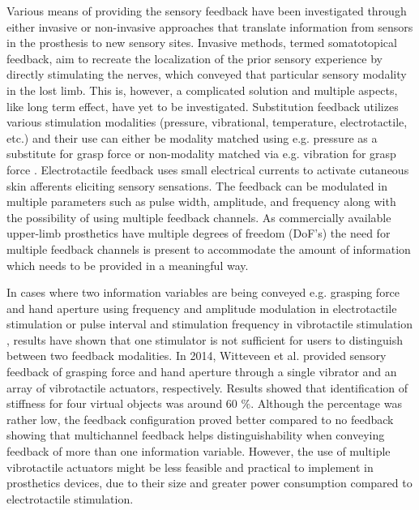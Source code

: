 %
Various means of providing the sensory feedback have been investigated through either invasive or non-invasive approaches that translate information from sensors in the prosthesis to new sensory sites. Invasive methods, termed somatotopical feedback, aim to recreate the localization of the prior sensory experience by directly stimulating the nerves, which conveyed that particular sensory modality in the lost limb. This is, however, a complicated solution and multiple aspects, like long term effect, have yet to be investigated. \cite{Schofield2014,Stephens-Fripp2018} 
Substitution feedback utilizes various stimulation modalities (pressure, vibrational, temperature, electrotactile, etc.) and their use can either be modality matched using e.g. pressure as a substitute for grasp force \cite{Godfrey2017} or non-modality matched via e.g. vibration for grasp force \cite{Ninu2014,Nabeel2016}. 
Electrotactile feedback uses small electrical currents to activate cutaneous skin afferents eliciting sensory sensations. The feedback can be modulated in multiple parameters such as pulse width, amplitude, and frequency along with the possibility of using multiple feedback channels. \cite{Geng2012} As commercially available upper-limb prosthetics have multiple degrees of freedom (DoF's) \cite{Cordella2016} the need for multiple feedback channels is present to accommodate the amount of information which needs to be provided in a meaningful way. 

%
In cases where two information variables are being conveyed e.g. grasping force and hand aperture using frequency and amplitude modulation in electrotactile stimulation \cite{Prior1976} or pulse interval and stimulation frequency in vibrotactile stimulation \cite{Chatterjee2008}, results have shown that one stimulator is not sufficient for users to distinguish between two feedback modalities. In 2014, Witteveen et al. \cite{Witteveen2014} provided sensory feedback of grasping force and hand aperture through a single vibrator and an array of vibrotactile actuators, respectively. Results showed that identification of stiffness for four virtual objects was around 60 $\%$. Although the percentage was rather low, the feedback configuration proved better compared to no feedback showing that multichannel feedback helps distinguishability when conveying feedback of more than one information variable. \cite{Witteveen2014} However, the use of multiple vibrotactile actuators might be less feasible and practical to implement in prosthetics devices, due to their size and greater power consumption compared to electrotactile stimulation.  

